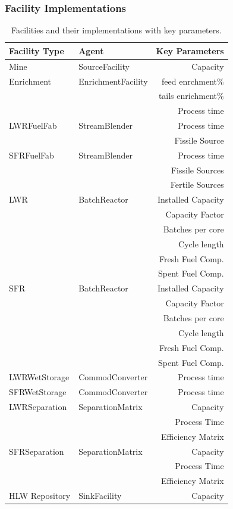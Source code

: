 \subsubsection{Facility Implementations}

\begin{table}[htbp!]
\centering
\begin{tabular}{|l|l|r|}
\hline
\textbf{Facility Type} &\textbf{Agent} & \textbf{Key Parameters}\\
\hline
Mine & SourceFacility & Capacity\\
\hline
Enrichment & EnrichmentFacility & feed enrchment\% \\
& & tails enrichment\% \\
& & Process time \\
\hline
LWRFuelFab & StreamBlender & Process time\\
& & Fissile Source\\
\hline
SFRFuelFab & StreamBlender  & Process time\\
& & Fissile Sources\\
& & Fertile Sources\\
\hline
LWR & BatchReactor & Installed Capacity \\
& & Capacity Factor \\
& & Batches per core \\ 
& & Cycle length\\
& & Fresh Fuel Comp. \\
& & Spent Fuel Comp. \\
\hline
SFR & BatchReactor & Installed Capacity\\
& & Capacity Factor \\
& & Batches per core \\ 
& & Cycle length\\
& & Fresh Fuel Comp. \\
& & Spent Fuel Comp. \\
\hline
LWRWetStorage & CommodConverter & Process time\\
\hline
SFRWetStorage & CommodConverter & Process time\\
\hline
LWRSeparation & SeparationMatrix & Capacity\\
& & Process Time\\
& & Efficiency Matrix\\
\hline
SFRSeparation & SeparationMatrix & Capacity\\
& & Process Time\\
& & Efficiency Matrix\\
\hline
HLW Repository & SinkFacility & Capacity \\
\hline
\end{tabular}
\caption{Facilities and their implementations with key parameters.}
\label{tab:facimpl}
\end{table}
\FloatBarrier

